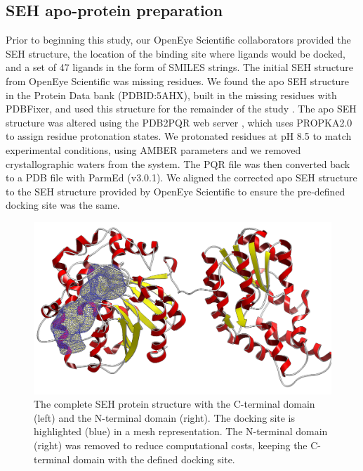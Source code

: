 \subsection{SEH apo-protein preparation}
Prior to beginning this study, our OpenEye Scientific collaborators provided the SEH structure, the location of the binding site where ligands would be docked, and a set of 47 ligands in the form of SMILES strings.
The initial SEH structure from OpenEye Scientific was missing residues.
We found the apo SEH structure in the Protein Data bank (PDBID:5AHX), built in the missing residues with PDBFixer, and used this structure for the remainder of the study \cite{noauthor_pdbfixer_2019}.
The apo SEH structure was altered using the PDB2PQR web server \cite{pdb2pqr}, which uses PROPKA2.0 to assign residue protonation states.
We protonated residues at pH 8.5 to match experimental conditions, using AMBER parameters \cite{jurrus_improvements_2018,sondergaard_improved_2011,noauthor_propka3:_nodate} and we removed crystallographic waters from the system.
The PQR file was then converted back to a PDB file with ParmEd (v3.0.1).
We aligned the corrected apo SEH structure to the SEH structure provided by OpenEye Scientific to ensure the pre-defined docking site was the same.

\begin{figure}
    \centering
    \includegraphics[width=\linewidth]{chapter6/Figures/fullprotein.png}
    \caption[SEH Complete Protein]{The complete SEH protein structure with the C-terminal domain (left) and the N-terminal domain (right). The docking site is highlighted (blue) in a mesh representation. The N-terminal domain (right) was removed to reduce computational costs, keeping the C-terminal domain with the defined docking site.}
    \label{fig:full-protein}
\end{figure}

